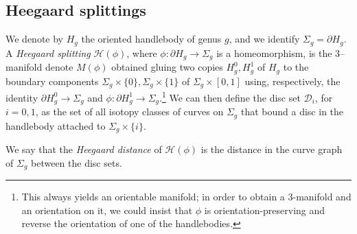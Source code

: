 \documentclass[11pt, oneside]{amsart}
\newtheorem{lemma}{Lemma}[section]
\theoremstyle{definition}
\theoremstyle{definition}
\newcommand{\calH} {\ensuremath {\mathcal{H}}}
\newcommand{\calD} {\ensuremath {\mathcal{D}}}
\begin{document}
\subsection{Heegaard splittings}\label{subsec:heegard}
We denote by $H_g$ the oriented handlebody of genus $g$, and we identify $\Sigma_g=\partial H_g$. A \emph{Heegaard splitting} $\calH(\phi)$, where $\phi:\partial H_g\to\Sigma_g$ is a homeomorphism, is the $3$--manifold denote $M(\phi)$ obtained gluing two copies $H^0_g,H^1_g$ of $H_g$ to the boundary components $\Sigma_g\times\{0\}, \Sigma_g\times\{1\}$ of $\Sigma_g\times[0,1]$ using, respectively, the identity $\partial H^0_g\to\Sigma_g$ and $\phi:\partial H^1_g\to\Sigma_g$.\footnote{This always yields an orientable manifold; in order to obtain a 3-manifold and an orientation on it, we could insist that $\phi$ is orientation-preserving and reverse the orientation of one of the handlebodies.}  We can then define the disc set $\calD_i$, for $i=0,1$, as the set of all isotopy classes of curves on $\Sigma_g$ that bound a disc in the handlebody attached to $\Sigma_g\times\{i\}$.

 We say that the \emph{Heegaard distance} of $\calH(\phi)$ is the distance in the curve graph of $\Sigma_g$ between the disc sets.
% 
% 
\end{document}
